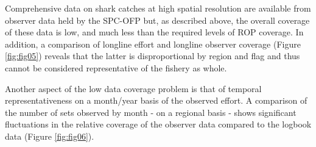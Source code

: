 \documentclass[12pt]{SCreport}
\begin{document}
Comprehensive data on shark catches at high spatial resolution are available from observer data held by the SPC-OFP but, as described above, the overall coverage of these data is low, and much less than the required levels of ROP coverage. In addition, a comparison of longline effort and longline observer coverage (Figure \ref{fig:fig05}) reveals that the latter is disproportional by region and flag and thus cannot be considered representative of the fishery as whole.

Another aspect of the low data coverage problem is that of temporal representativeness on a month/year basis of the observed effort. A comparison of the number of sets observed by month - on a regional basis - shows significant fluctuations in the relative coverage of the observer data compared to the logbook data (Figure \ref{fig:fig06}).
\end{document}
